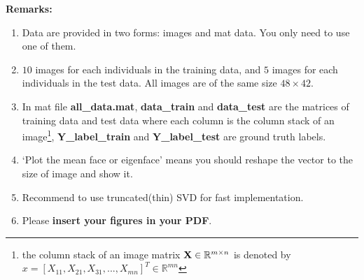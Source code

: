 \documentclass[english,onecolumn]{IEEEtran}
\newcommand{\Rbb}{\mathbb{R}}
\newcommand{\bX}{{\bf X}}
\begin{document}
{\bf Remarks:}
\begin{enumerate}
    \item Data are provided in two forms: images and mat data. You only need to use one of them. 
    \item $10$ images for each individuals in the training data, and $5$ images for each individuals in the test data. All images are of the same size $48\times 42$.
    \item In mat file \textbf{all\_data.mat}, \textbf{data\_train} and \textbf{data\_test} are the matrices of training data and test data where each column is the column stack of an image\footnote{the column stack of an image matrix $\bX\in \Rbb^{m\times n}$ is denoted by $x = [X_{11},X_{21},X_{31},...,X_{mn}]^T\in\Rbb^{mn}$}, \textbf{Y\_label\_train} and \textbf{Y\_label\_test} are ground truth labels.
    \item `Plot the mean face or eigenface' means you should reshape the vector to the size of image and show it.
    \item Recommend to use truncated(thin) SVD for fast implementation.
    \item Please \textbf{insert your figures in your PDF}.
\end{enumerate}
\end{document}
